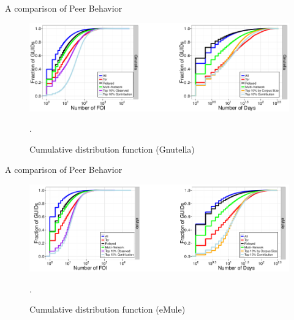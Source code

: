 \documentclass[notes]{beamer}
\begin{document}
\begin{frame}

\begin{block}{A comparison of Peer Behavior}

\begin{figure}[!htb]
\centering
\includegraphics[scale=0.35]{CDF_characterization_gnutella}
\caption{Cumulative distribution function (Gnutella)}.
\label{fig:CDF_characterization_gnutella}
\end{figure}

\end{block}

\end{frame}

\begin{frame}

\begin{block}{A comparison of Peer Behavior}

\begin{figure}[!htb]
\centering
\includegraphics[scale=0.35]{CDF_characterization_emule}
\caption{Cumulative distribution function (eMule)}.
\label{fig:CDF_characterization_emule}
\end{figure}

\end{block}

\end{frame}
\end{document}
